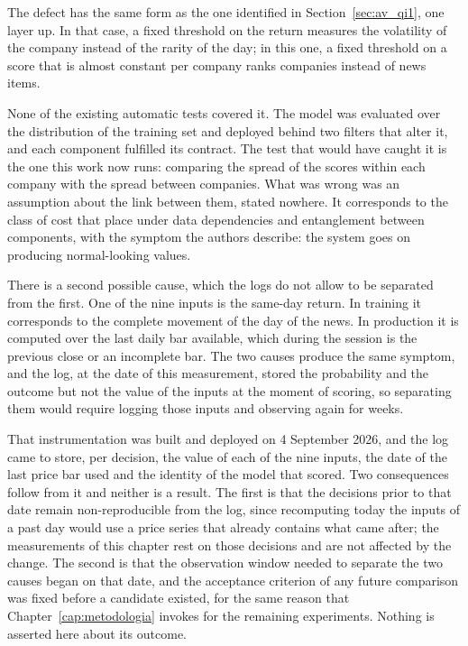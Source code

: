 The defect has the same form as the one identified in Section~\ref{sec:av_qi1}, one layer up. In
that case, a fixed threshold on the return measures the volatility of the company instead of the
rarity of the day; in this one, a fixed threshold on a score that is almost constant per company
ranks companies instead of news items.

None of the existing automatic tests covered it. The model was evaluated over the distribution of
the training set and deployed behind two filters that alter it, and each component fulfilled its
contract. The test that would have caught it is the one this work now runs: comparing the spread of
the scores within each company with the spread between companies. What was wrong was an assumption
about the link between them, stated nowhere. It corresponds to the class of cost that
\textcite{sculley2015debt} place under data dependencies and entanglement between components, with
the symptom the authors describe: the system goes on producing normal-looking values.

There is a second possible cause, which the logs do not allow to be separated from the first. One
of the nine inputs is the same-day return. In training it corresponds to the complete movement of
the day of the news. In production it is computed over the last daily bar available, which during
the session is the previous close or an incomplete bar. The two causes produce the same symptom,
and the log, at the date of this measurement, stored the probability and the outcome but not the
value of the inputs at the moment of scoring, so separating them would require logging those inputs
and observing again for weeks.

That instrumentation was built and deployed on 4 September 2026, and the log came to store, per
decision, the value of each of the nine inputs, the date of the last price bar used and the
identity of the model that scored. Two consequences follow from it and neither is a result. The
first is that the decisions prior to that date remain non-reproducible from the log, since
recomputing today the inputs of a past day would use a price series that already contains what came
after; the measurements of this chapter rest on those decisions and are not affected by the change.
The second is that the observation window needed to separate the two causes began on that date, and
the acceptance criterion of any future comparison was fixed before a candidate existed, for the same
reason that Chapter~\ref{cap:metodologia} invokes for the remaining experiments. Nothing is
asserted here about its outcome.

